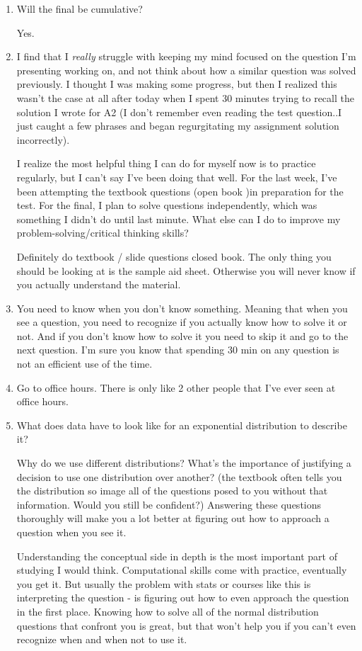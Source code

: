 \begin{enumerate}
    \item Will the final be cumulative?

    Yes. 
    
    \item I find that I \textit{really} struggle with keeping my mind focused on the question I'm presenting working on, and not think about how a similar question was solved previously. I thought I was making some progress, but then I realized this wasn't the case at all after today when I spent 30 minutes trying to recall the solution I wrote for A2 (I don't remember even reading the test question..I just caught a few phrases and began regurgitating my assignment solution incorrectly).

    I realize the most helpful thing I can do for myself now is to practice regularly, but I can't say I've been doing that well. For the last week, I've been attempting the textbook questions (open book )in preparation for the test. For the final, I plan to solve questions independently, which was something I didn't do until last minute. What else can I do to improve my problem-solving/critical thinking skills?

    Definitely do textbook / slide questions closed book. The only thing you should be looking at is the sample aid sheet. Otherwise you will never know if you actually understand the material.

    \item You need to know when you don't know something. Meaning that when you see a question, you need to recognize if you actually know how to solve it or not. And if you don't know how to solve it you need to skip it and go to the next question. I'm sure you know that spending 30 min on any question is not an efficient use of the time.  
    
    \item Go to office hours. There is only like 2 other people that I've ever seen at office hours.
    
    \item What does data have to look like for an exponential distribution to describe it?

    Why do we use different distributions? What's the importance of justifying a decision to use one distribution over another? (the textbook often tells you the distribution so image all of the questions posed to you without that information. Would you still be confident?) Answering these questions thoroughly will make you a lot better at figuring out how to approach a question when you see it.

    Understanding the conceptual side in depth is the most important part of studying I would think. Computational skills come with practice, eventually you get it. But usually the problem with stats or courses like this is interpreting the question - is figuring out how to even approach the question in the first place. Knowing how to solve all of the normal distribution questions that confront you is great, but that won't help you if you can't even recognize when and when not to use it.
\end{enumerate}